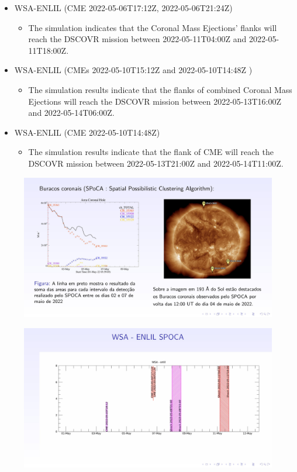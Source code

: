 \documentclass[a4paper, 10pt]{article}
\begin{document}
\begin{itemize} 
 \item WSA-ENLIL (CME 2022-05-06T17:12Z, 2022-05-06T21:24Z)
\begin{itemize} 
 \item The simulation indicates that the Coronal Mass Ejections’ flanks will reach the DSCOVR mission between 2022-05-11T04:00Z and 2022-05-11T18:00Z.
\end{itemize} 
 \item WSA-ENLIL (CMEs 2022-05-10T15:12Z and 2022-05-10T14:48Z )
\begin{itemize} 
 \item The simulation results indicate that the flanks of combined Coronal Mass Ejections will reach the DSCOVR mission between 2022-05-13T16:00Z and 2022-05-14T06:00Z.
\end{itemize} 
 \item WSA-ENLIL (CME 2022-05-10T14:48Z)
\begin{itemize} 
 \item The simulation results indicate that the flank of CME will reach the DSCOVR mission between 2022-05-13T21:00Z and 2022-05-14T11:00Z. 
\end{itemize} 
 \end{itemize} 
 

    \begin{figure}[H]
        \centering
        \includegraphics[width=14cm]{./figures/en_outfileSun_0.jpg}
    \end{figure} 
 

    
    \begin{figure}[H]
        \centering
        \includegraphics[width=14cm]{./figures/en_outfileSun_1.jpg}
    \end{figure} 
 
\end{document}
